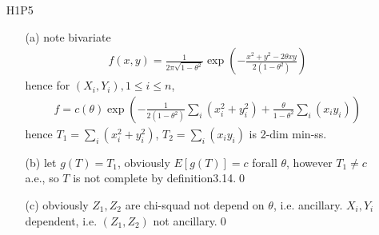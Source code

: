 \documentclass[paper=a4, fontsize=11pt]{scrartcl} %
\numberwithin{equation}{section} %
\numberwithin{figure}{section} %
\numberwithin{table}{section} %
\begin{document}
\begin{itemize}
\begin{itemize}
		\item[(b)]
		\begin{align}
			(X_1-a)/(X_i-a) = Z_1/Z_i \sim F_1/F_i
		\end{align}
		which not depend on parameter since $F,a$ known, i.e. ancillary.
		\item[(c)]
		\begin{align}
			(X_1-X_i)/(X_2-X_i) = (Z_1-Z_i)/(Z_2-Z_i) \sim (F_1-F_i)/(F_2-F_i)
		\end{align}
		which not depend on parameter since $F$ known, i.e. ancillary.\qed
	\end{itemize}
	\item[H1P5]
	\begin{itemize}
		\item[(a)] note bivariate
		\begin{align}
			f(x,y) = \frac{1}{2\pi \sqrt{1-\theta^2}} \exp(-\frac{x^2+y^2-2\theta xy}{2(1-\theta^2)} )
		\end{align}
		hence for $(X_i,Y_i),1\leq i\leq n$,
		\begin{align}
			f = c(\theta) \exp( -\frac{1}{2(1-\theta^2)}\sum_i(x_i^2+y_i^2)+ \frac{\theta}{1-\theta^2}\sum_i(x_iy_i) )
		\end{align}
		hence $T_1 = \sum_i(x_i^2+y_i^2)$, $T_2=\sum_i(x_iy_i)$ is 2-dim min-ss.
		\item[(b)] let $g(T)=T_1$, obviously $E[g(T)]=c$ forall $\theta$, however $T_1\neq c$ a.e., so $T$ is not complete by definition3.14.\qed
		\item[(c)] obviously $Z_1,Z_2$ are chi-squad not depend on $\theta$, i.e. ancillary. $X_i,Y_i$ dependent, i.e. $(Z_1,Z_2)$ not ancillary.\qed
	\end{itemize}
	

\end{itemize}
\end{document}
